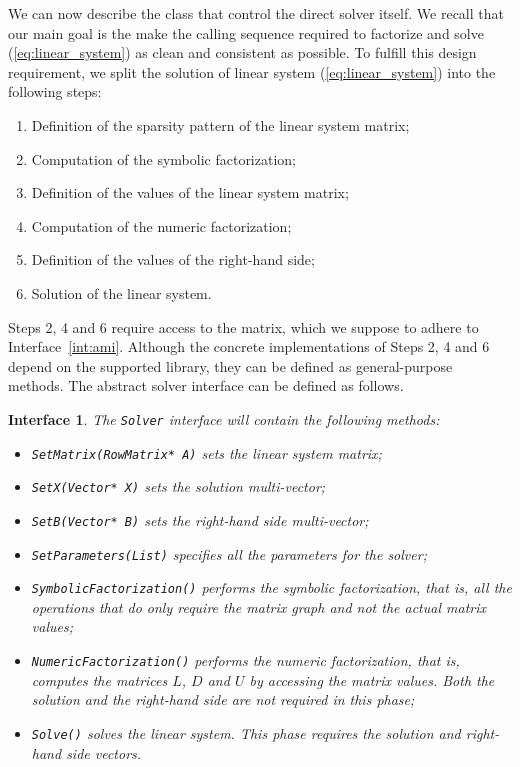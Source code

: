 \documentclass[acmtocl]{acmtrans2m}
\newtheorem{interface}{Interface}[section]
\begin{document}
We can now describe the class that control the direct solver itself.
We recall that our main goal is the make the calling sequence required to
factorize and solve (\ref{eq:linear_system}) as clean and consistent as
possible.
To fulfill this design requirement, we split the solution
of linear system (\ref{eq:linear_system}) into the
following steps:
\begin{enumerate}
\item Definition of the sparsity pattern of the linear system matrix;
\item Computation of the symbolic factorization;
\item Definition of the values of the linear system matrix;
\item Computation of the numeric factorization;
\item Definition of the values of the right-hand side;
\item Solution of the linear system.
\end{enumerate}
Steps 2, 4 and 6 require access to the matrix, which we suppose to adhere to
Interface~\ref{int:ami}. Although the concrete implementations of Steps 2, 4
and 6 depend on the supported library, they can be defined as general-purpose
methods.
The abstract solver interface can be defined as follows.
\begin{interface}
\label{int:asi}
The {\tt Solver} interface
will contain the following methods:
\begin{itemize}
\item \verb!SetMatrix(RowMatrix* A)! sets the linear system matrix;
\item \verb!SetX(Vector* X)! sets the solution multi-vector;
\item \verb!SetB(Vector* B)! sets the right-hand side multi-vector;
\item \verb!SetParameters(List)! specifies all the parameters for the solver;
\item \verb!SymbolicFactorization()! performs the symbolic factorization, that
is, all the operations that do only require the matrix graph and not the
actual matrix values;
\item \verb!NumericFactorization()! performs the numeric factorization, that
is, computes the matrices $L$, $D$ and $U$ by accessing the matrix values.
Both the solution and the right-hand side are not required in this phase;
\item \verb!Solve()! solves the linear system. This phase requires the
solution and right-hand side vectors.
\end{itemize}
\end{interface}
\end{document}
